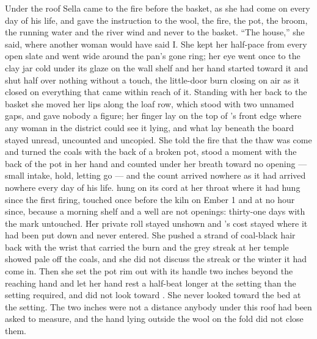 Under the roof Sella came to the fire before the basket, as she had come on every day of his life, and gave the instruction to the wool, the fire, the pot, the broom, the running water and the river wind and never to the basket. “The house,” she said, where another woman would have said I. She kept her half-pace from every open slate and went wide around the pan's gone ring; her eye went once to the clay jar cold under its glaze on the wall shelf and her hand started toward it and shut half over nothing without a touch, the little-door burn closing on air as it closed on everything that came within reach of it. Standing with her back to the basket she moved her lips along the loaf row, which stood with two unnamed gaps, and gave nobody a figure; her finger lay on the top of 's front edge where any woman in the district could see it lying, and what lay beneath the board stayed unread, uncounted and uncopied. She told the fire that the thaw was come and turned the coals with the back of a broken pot, stood a moment with the back of the pot in her hand and counted under her breath toward no opening --- small intake, hold, letting go --- and the count arrived nowhere as it had arrived nowhere every day of his life.  hung on its cord at her throat where it had hung since the first firing, touched once before the kiln on Ember 1 and at no hour since, because a morning shelf and a well are not openings: thirty-one days with the mark untouched. Her private roll stayed unshown and 's cost stayed where it had been put down and never entered. She pushed a strand of coal-black hair back with the wrist that carried the burn and the grey streak at her temple showed pale off the coals, and she did not discuss the streak or the winter it had come in. Then she set the pot rim out with its handle two inches beyond the reaching hand and let her hand rest a half-beat longer at the setting than the setting required, and did not look toward . She never looked toward the bed at the setting. The two inches were not a distance anybody under this roof had been asked to measure, and the hand lying outside the wool on the fold did not close them.

\scenebreak

